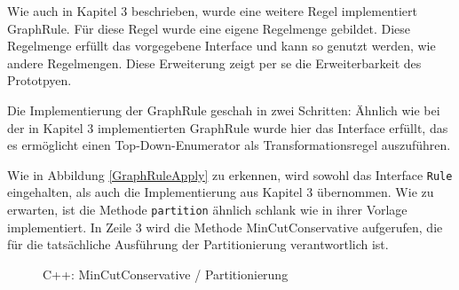 Wie auch in Kapitel 3 beschrieben, wurde eine weitere Regel implementiert GraphRule. Für diese Regel wurde eine eigene Regelmenge gebildet. Diese Regelmenge erfüllt das vorgegebene Interface und kann so genutzt werden, wie andere Regelmengen. Diese Erweiterung zeigt per se die Erweiterbarkeit des Prototpyen.

Die Implementierung der GraphRule geschah in zwei Schritten: Ähnlich wie bei der in Kapitel 3 implementierten GraphRule wurde hier das Interface erfüllt, das es ermöglicht einen Top-Down-Enumerator als Transformationsregel auszuführen.




Wie in Abbildung \ref{GraphRuleApply} zu erkennen, wird sowohl das Interface \texttt{Rule} eingehalten, als auch die Implementierung aus Kapitel 3 übernommen. Wie zu erwarten, ist die Methode \texttt{partition} ähnlich schlank wie in ihrer Vorlage implementiert. In Zeile 3 wird die Methode MinCutConservative aufgerufen, die für die tatsächliche Ausführung der Partitionierung verantwortlich ist.



\begin{figure}[ht]

\caption{C++: MinCutConservative / Partitionierung}
\label{fig:MinCutConservative}
\end{figure}

